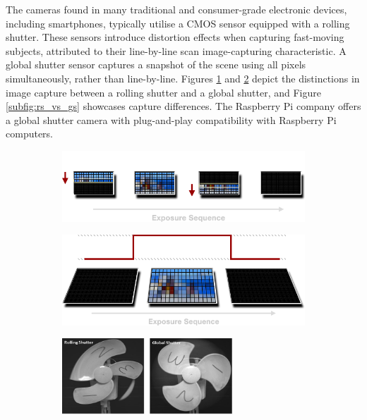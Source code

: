 The cameras found in many traditional and consumer-grade electronic devices, including smartphones, typically utilise a CMOS sensor equipped with a rolling shutter. These sensors introduce distortion effects when capturing fast-moving subjects, attributed to their line-by-line scan image-capturing characteristic. A global shutter sensor captures a snapshot of the scene using all pixels simultaneously, rather than line-by-line. Figures \ref{subfig:rs_timeline} and \ref{subfig:gs_timeline} depict the distinctions in image capture between a rolling shutter and a global shutter, and Figure \ref{subfig:rs_vs_gs} showcases capture differences. The Raspberry Pi company offers a global shutter camera with plug-and-play compatibility with Raspberry Pi computers.

\begin{figure}[H]
    \centering
    \begin{subfigure}{.45\textwidth}
        \centering
        \includegraphics[width=1\linewidth]{assets/rolling-shutter-timeline.png}
        \caption{}
        \label{subfig:rs_timeline}
    \end{subfigure}
    \hfill
    \begin{subfigure}{.45\textwidth}
        \centering
        \includegraphics[width=1\linewidth]{assets/global-shutter-timeline.png}
        \caption{}
        \label{subfig:gs_timeline}
    \end{subfigure}
    \hfill
    \begin{subfigure}{0.45\textwidth}
        \centering
        \includegraphics[width=0.7\textwidth]{assets/rolling-vs-global-shutter.jpeg}

\end{subfigure}
\end{figure}

